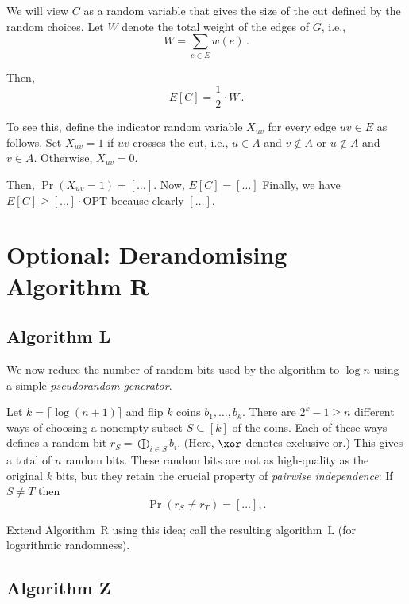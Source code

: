 \documentclass{tufte-handout}
\begin{document}
We will view $C$ as a random variable that gives the size of the cut
defined by the random choices.
Let $W$ denote the total weight of the edges of $G$, i.e.,
\[ W= \sum_{e\in E} w(e)\,.\]

Then,
\begin{equation}\label{eq: E[C]}
E[C] = \textstyle\frac{1}{2}\cdot W\,.
\end{equation}

To see this, define the indicator random variable $X_{uv}$ for every
edge $uv\in E$ as follows.
Set $X_{uv}=1$ if $uv$ crosses the cut, i.e., $u\in A$ and $v\notin A$
or $u\notin A$ and $v\in A$.
Otherwise, $X_{uv} = 0$.

Then, $\Pr(X_{uv} = 1) = [\ldots]$.
Now, $E[C]=[\ldots]$ Finally, we have 
\(E[C]\geq [\ldots]\cdot \text{OPT}\) because clearly
$[\ldots]$.


\newpage
\section{Optional: Derandomising Algorithm R}

\subsection{Algorithm L} 


We now reduce the number of random bits used by the algorithm to $\log
n$ using a simple \emph{pseudorandom generator}.


Let $k=\lceil\log (n+1)\rceil$ and flip $k$ coins $b_1,\ldots, b_k$.
There are $2^k -1 \geq n$ different ways of choosing a nonempty subset
$S\subseteq [k]$ of the coins.
Each of these ways defines a random bit $r_S =\bigoplus_{i\in S} b_i$.
(Here, $\xor$ denotes exclusive or.)
This gives a total of $n$ random bits.
These random bits are not as high-quality as the original $k$ bits,
but they retain the crucial property of \emph{pairwise independence}:
If $S\neq T$ then
\[ \Pr(r_S\neq r_T) = [\ldots],.\]

Extend Algorithm~R using this idea; call the resulting
algorithm~L (for logarithmic randomness).

\subsection{Algorithm Z}
\end{document}

